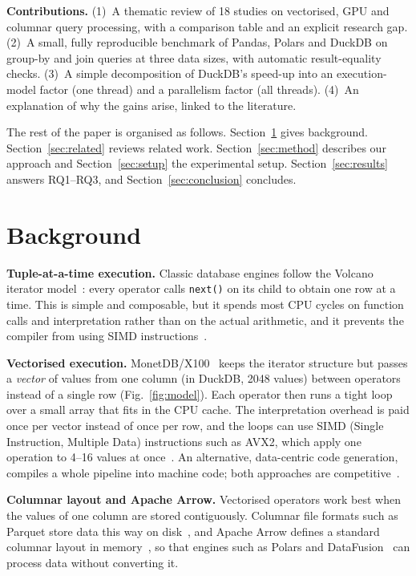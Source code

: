 \documentclass[conference,a4paper]{IEEEtran}
\begin{document}
\textbf{Contributions.} (1)~A thematic review of 18 studies on vectorised, GPU and columnar query processing, with a comparison table and an explicit research gap. (2)~A small, fully reproducible benchmark of Pandas, Polars and DuckDB on group-by and join queries at three data sizes, with automatic result-equality checks. (3)~A simple decomposition of DuckDB's speed-up into an execution-model factor (one thread) and a parallelism factor (all threads). (4)~An explanation of why the gains arise, linked to the literature.

The rest of the paper is organised as follows. Section~\ref{sec:background} gives background. Section~\ref{sec:related} reviews related work. Section~\ref{sec:method} describes our approach and Section~\ref{sec:setup} the experimental setup. Section~\ref{sec:results} answers RQ1--RQ3, and Section~\ref{sec:conclusion} concludes.

\section{Background}\label{sec:background}
\textbf{Tuple-at-a-time execution.} Classic database engines follow the Volcano iterator model~\cite{graefe94}: every operator calls \texttt{next()} on its child to obtain one row at a time. This is simple and composable, but it spends most CPU cycles on function calls and interpretation rather than on the actual arithmetic, and it prevents the compiler from using SIMD instructions~\cite{boncz05}.

\textbf{Vectorised execution.} MonetDB/X100~\cite{boncz05} keeps the iterator structure but passes a \emph{vector} of values from one column (in DuckDB, 2048 values) between operators instead of a single row (Fig.~\ref{fig:model}). Each operator then runs a tight loop over a small array that fits in the CPU cache. The interpretation overhead is paid once per vector instead of once per row, and the loops can use SIMD (Single Instruction, Multiple Data) instructions such as AVX2, which apply one operation to 4--16 values at once~\cite{polychroniou15}. An alternative, data-centric code generation, compiles a whole pipeline into machine code; both approaches are competitive~\cite{kersten18}.

\textbf{Columnar layout and Apache Arrow.} Vectorised operators work best when the values of one column are stored contiguously. Columnar file formats such as Parquet store data this way on disk~\cite{zeng23}, and Apache Arrow defines a standard columnar layout in memory~\cite{arrow}, so that engines such as Polars and DataFusion~\cite{lamb24} can process data without converting it.
\end{document}
